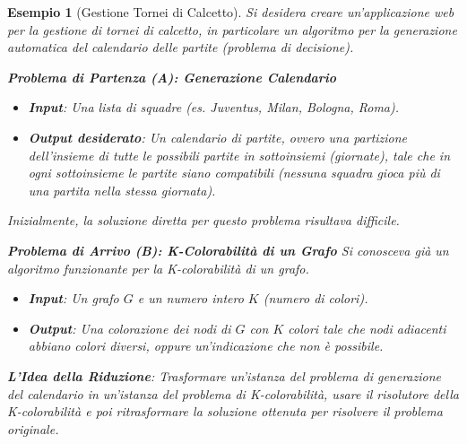 \documentclass[a4paper]{article}
\newtheorem{example}[theorem]{Esempio}
\begin{document}
\begin{example}[Gestione Tornei di Calcetto]
Si desidera creare un'applicazione web per la gestione di tornei di calcetto, in particolare un algoritmo per la generazione automatica del calendario delle partite (problema di decisione).

\textbf{Problema di Partenza (A): Generazione Calendario}
\begin{itemize}
    \item \textbf{Input}: Una lista di squadre (es. Juventus, Milan, Bologna, Roma).
    \item \textbf{Output desiderato}: Un calendario di partite, ovvero una partizione dell'insieme di tutte le possibili partite in sottoinsiemi (giornate), tale che in ogni sottoinsieme le partite siano compatibili (nessuna squadra gioca più di una partita nella stessa giornata).
\end{itemize}
Inizialmente, la soluzione diretta per questo problema risultava difficile.

\textbf{Problema di Arrivo (B): K-Colorabilità di un Grafo}
Si conosceva già un algoritmo funzionante per la K-colorabilità di un grafo.
\begin{itemize}
    \item \textbf{Input}: Un grafo $G$ e un numero intero $K$ (numero di colori).
    \item \textbf{Output}: Una colorazione dei nodi di $G$ con $K$ colori tale che nodi adiacenti abbiano colori diversi, oppure un'indicazione che non è possibile.
\end{itemize}

\textbf{L'Idea della Riduzione}: Trasformare un'istanza del problema di generazione del calendario in un'istanza del problema di K-colorabilità, usare il risolutore della K-colorabilità e poi ritrasformare la soluzione ottenuta per risolvere il problema originale.


\end{example}
\end{document}

